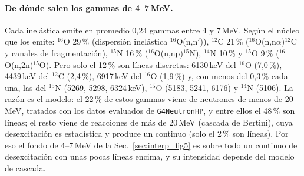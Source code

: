 \documentclass[11pt,a4paper]{article}
\begin{document}
\paragraph{De dónde salen los gammas de 4--7\,MeV.} Cada inelástica emite en promedio 0,24 gammas entre 4 y 7\,MeV.
Según el núcleo que los emite: $^{16}$O 29\,\% (dispersión inelástica $^{16}$O(n,n$'$)), $^{12}$C 21\,\% ($^{16}$O(n,n$\alpha$)$^{12}$C y canales de fragmentación),
$^{15}$N 16\,\% ($^{16}$O(n,np)$^{15}$N), $^{14}$N 10\,\% y $^{15}$O 9\,\% ($^{16}$O(n,2n)$^{15}$O).
Pero solo el 12\,\% son líneas discretas: 6130\,keV del $^{16}$O (7,0\,\%), 4439\,keV del $^{12}$C (2,4\,\%),
6917\,keV del $^{16}$O (1,9\,\%) y, con menos del 0,3\,\% cada una, las del $^{15}$N (5269, 5298, 6324\,keV), $^{15}$O (5183, 5241, 6176) y $^{14}$N (5106).
La razón es el modelo: el 22\,\% de estos gammas viene de neutrones de menos de 20\,MeV, tratados con los datos evaluados de \texttt{G4NeutronHP}, y entre ellos el 48\,\% son líneas;
el resto viene de reacciones de más de 20\,MeV (cascada de Bertini), cuya desexcitación es estadística y produce un continuo (solo el 2\,\% son líneas).
Por eso el fondo de 4--7\,MeV de la Sec.~\ref{sec:interp_fig5} es sobre todo un continuo de desexcitación con unas pocas líneas encima, y su intensidad depende del modelo de cascada.
\end{document}
